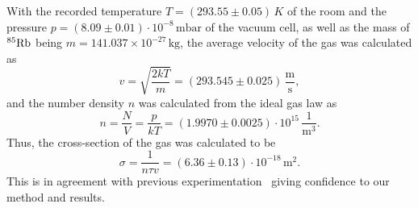 \documentclass[twocolumn]{article}
\begin{document}
With the recorded temperature $T = (293.55 \pm 0.05) \, K$ of the room and the pressure $p = (8.09 \pm 0.01)\cdot 10^{-8} \, \text{mbar}$ of the vacuum cell, as well as the mass of $^{85}\ce{Rb}$ being $m = 141.037 \times 10^{-27} \, \text{kg}$, the average velocity of the gas was calculated as
\begin{equation}
v = \sqrt{\frac{2kT}{m}} = (293.545 \pm 0.025) \, \frac{\text{m}}{\text{s}}, \nonumber
\end{equation}
and the number density $n$ was calculated from the ideal gas law as
\begin{equation}
n = \frac{N}{V} = \frac{p}{kT} = (1.9970 \pm 0.0025)\cdot 10^{15} \, \frac{1}{\text{m}^3}.\nonumber
\end{equation}
Thus, the cross-section of the gas was calculated to be
\begin{equation}
\sigma = \frac{1}{n \tau v} = (6.36 \pm 0.13) \cdot 10^{-18} \, \text{m}^2. \nonumber
\end{equation}
This is in agreement with previous experimentation~\cite{cross} giving confidence to our method and results.
\end{document}

